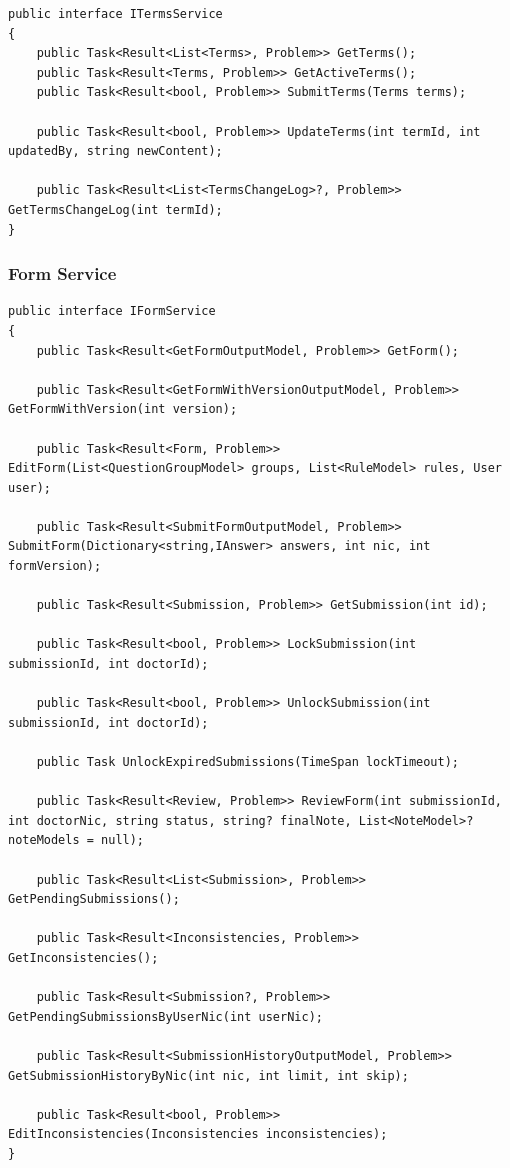 \begin{lstlisting}[style=sharpc]
public interface ITermsService
{
	public Task<Result<List<Terms>, Problem>> GetTerms();
	public Task<Result<Terms, Problem>> GetActiveTerms();
	public Task<Result<bool, Problem>> SubmitTerms(Terms terms);
	
	public Task<Result<bool, Problem>> UpdateTerms(int termId, int updatedBy, string newContent);
	
	public Task<Result<List<TermsChangeLog>?, Problem>> GetTermsChangeLog(int termId);
}
\end{lstlisting}


\subsubsection{Form Service}

\begin{lstlisting}[style=sharpc]
public interface IFormService
{
	public Task<Result<GetFormOutputModel, Problem>> GetForm();
	
	public Task<Result<GetFormWithVersionOutputModel, Problem>> GetFormWithVersion(int version);
	
	public Task<Result<Form, Problem>> EditForm(List<QuestionGroupModel> groups, List<RuleModel> rules, User user);
	
	public Task<Result<SubmitFormOutputModel, Problem>> SubmitForm(Dictionary<string,IAnswer> answers, int nic, int formVersion);
	
	public Task<Result<Submission, Problem>> GetSubmission(int id);
	
	public Task<Result<bool, Problem>> LockSubmission(int submissionId, int doctorId);
	
	public Task<Result<bool, Problem>> UnlockSubmission(int submissionId, int doctorId);
	
	public Task UnlockExpiredSubmissions(TimeSpan lockTimeout);
	
	public Task<Result<Review, Problem>> ReviewForm(int submissionId, int doctorNic, string status, string? finalNote, List<NoteModel>? noteModels = null);
	
	public Task<Result<List<Submission>, Problem>> GetPendingSubmissions();
	
	public Task<Result<Inconsistencies, Problem>> GetInconsistencies();
	
	public Task<Result<Submission?, Problem>> GetPendingSubmissionsByUserNic(int userNic);
	
	public Task<Result<SubmissionHistoryOutputModel, Problem>> GetSubmissionHistoryByNic(int nic, int limit, int skip);
	
	public Task<Result<bool, Problem>> EditInconsistencies(Inconsistencies inconsistencies);
}
\end{lstlisting}


